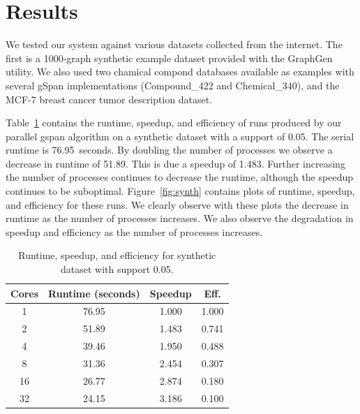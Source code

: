 \section{Results}
\label{sec:results}

We tested our system against various datasets collected from the internet.
The first is a 1000-graph synthetic example dataset provided with the 
GraphGen utility. We also used two chamical compond databases available as
examples with several gSpan implementations (Compound\_422 and Chemical\_340),
and the MCF-7 breast cancer tumor description dataset.

Table~\ref{tab:synth} contains the runtime, speedup, and efficiency of runs
produced by our parallel gspan algorithm on a synthetic dataset with
a support of 0.05. The serial runtime is 76.95~seconds. By doubling
the number of processes we observe a decrease in runtime of 51.89. This
is due a speedup of 1.483. Further increasing the number of processes continues
to decrease the runtime, although the speedup continues to be suboptimal.
Figure~\ref{fig:synth} contains plots of runtime, speedup, and efficiency for
these runs. We clearly observe with these plots the decrease in runtime as the
number of processes increases. We also observe the degradation in speedup and
efficiency as the number of processes increases.


\begin{table}[H]
\centering
\begin{tabular}{cccc}
\hline
Cores & Runtime (seconds) & Speedup &  Eff.  \\
\hline
1    &   76.95   &  1.000 &     1.000  \\
2    &   51.89   &  1.483 &     0.741  \\
4    &   39.46   &  1.950 &     0.488  \\
8    &   31.36   &  2.454 &     0.307  \\
16   &   26.77   &  2.874 &     0.180  \\
32   &   24.15   &  3.186 &     0.100  \\
\hline
\end{tabular}
\caption{Runtime, speedup, and efficiency for synthetic dataset with support
         0.05.}
\label{tab:synth}
\end{table}

